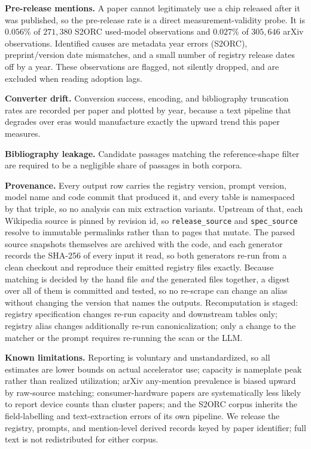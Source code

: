 \textbf{Pre-release mentions.} A paper cannot legitimately use a chip released
after it was published, so the pre-release rate is a direct measurement-validity
probe. It is $0.056\%$ of $271{,}380$ S2ORC used-model observations and
$0.027\%$ of $305{,}646$ arXiv observations. Identified causes are metadata
year errors (S2ORC), preprint/version date mismatches, and a small number of
registry release dates off by a year. These observations are flagged, not
silently dropped, and are excluded when reading adoption lags.

\textbf{Converter drift.} Conversion success, encoding, and bibliography
truncation rates are recorded per paper and plotted by year, because a text
pipeline that degrades over eras would manufacture exactly the upward trend this
paper measures.

\textbf{Bibliography leakage.} Candidate passages matching the
reference-shape filter are required to be a negligible share of passages in both
corpora.

\textbf{Provenance.} Every output row carries the registry version, prompt
version, model name and code commit that produced it, and every table is
namespaced by that triple, so no analysis can mix extraction variants.
Upstream of that, each Wikipedia source is pinned by revision id, so
\texttt{release\_source} and \texttt{spec\_source} resolve to immutable
permalinks rather than to pages that mutate. The parsed source snapshots
themselves are archived with the code, and each generator records the SHA-256 of
every input it read, so both generators re-run from a clean checkout and reproduce
their emitted registry files exactly. Because matching is decided by the hand file
\emph{and} the generated files together, a digest over all of them is committed
and tested, so no re-scrape can change an alias without changing the version that
names the outputs.
Recomputation is staged: registry specification changes re-run capacity and
downstream tables only; registry alias changes additionally re-run
canonicalization; only a change to the matcher or the prompt requires re-running
the scan or the LLM.

\textbf{Known limitations.} Reporting is voluntary and unstandardized, so all
estimates are lower bounds on actual accelerator use; capacity is nameplate peak
rather than realized utilization; arXiv any-mention prevalence is biased upward
by raw-source matching; consumer-hardware papers are systematically less likely
to report device counts than cluster papers; and the S2ORC corpus inherits the
field-labelling and text-extraction errors of its own pipeline. We release the
registry, prompts, and mention-level derived records keyed by paper identifier;
full text is not redistributed for either corpus.
